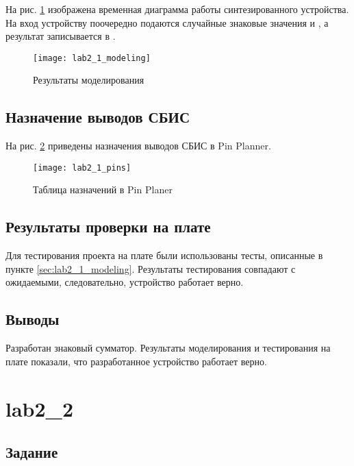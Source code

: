 На рис. \ref{fig:lab2_1_modeling} изображена временная диаграмма работы синтезированного устройства. На вход устройству поочередно подаются случайные знаковые значения  и , а результат записывается в .
\begin{figure}[H]
\begin{center}
	\texttt{[image: lab2\_1\_modeling]}
	\caption{Результаты моделирования}
	\label{fig:lab2_1_modeling}
\end{center}
\end{figure}

\subsection{Назначение выводов СБИС}

На рис. \ref{fig:lab2_1_pins} приведены назначения выводов СБИС в Pin Planner.

\begin{figure}[H]
\begin{center}
	\texttt{[image: lab2\_1\_pins]}
	\caption{Таблица назначений в Pin Planer}
	\label{fig:lab2_1_pins}
\end{center}
\end{figure}

\subsection{Результаты проверки на плате}

Для тестирования проекта на плате были использованы тесты, описанные в пункте \ref{sec:lab2_1_modeling}. Результаты тестирования совпадают с ожидаемыми, следовательно, устройство работает верно.

\subsection{Выводы}

Разработан знаковый сумматор. Результаты моделирования и тестирования на плате показали, что разработанное устройство работает верно.

\newpage

\section{lab2\_2}

\subsection{Задание}


